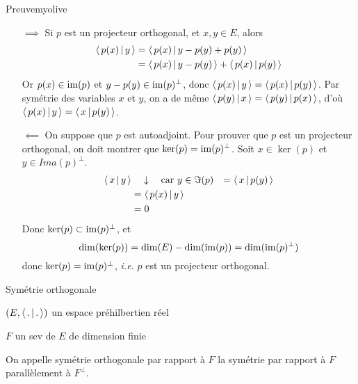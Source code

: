         \begin{demo}{Preuve}{myolive}
            \begin{itemize}
                \item[$\implies$] Si $p$ est un projecteur orthogonal, et $x,y \in E$, alors 
                \begin{align*}
                    \left<\,p(x)\,\middle|\,y\,\right> 
                    &= \left<\,p(x)\,\middle|\,y - p(y) + p(y)\,\right> \\
                    &= \left<\,p(x)\,\middle|\,y - p(y)\,\right> + \left<\,p(x)\,\middle|\,p(y)\,\right> \\
                \end{align*}
                Or $p(x) \in \operatorname{im}(p)$ et $y - p(y) \in \operatorname{im}(p)^{\perp}$, donc $\left<\,p(x)\,\middle|\,y\,\right> = \left<\,p(x)\,\middle|\,p(y)\,\right>$. Par symétrie des variables $x$ et $y$, on a de même $\left<\,p(y)\,\middle|\,x\,\right> = \left<\,p(y)\,\middle|\,p(x)\,\right>$, d’où $\left<\,p(x)\,\middle|\,y\,\right> = \left<\,x\,\middle|\,p(y)\,\right>$.
                \item[$\impliedby$] On suppose que $p$ est autoadjoint. Pour prouver que $p$ est un projecteur orthogonal, on doit montrer que $\ker(p) = \operatorname{im}(p)^{\perp}$. Soit $x \in \ker(p)$ et $y \in Ima(p)^{\perp}$. 
                \begin{align*}
                    \left<\,x\,\middle|\,y\,\right> 
                    & \quad \downarrow \quad \text{car } y \in \Im(p)
                    &= \left<\,x\,\middle|\,p(y)\,\right> \\
                    &= \left<\,p(x)\,\middle|\,y\,\right> \\
                    &= 0
                \end{align*}
                Donc $\ker(p) \subset \operatorname{im}(p)^{\perp}$, et 
                \[ \dim(\ker(p)) = \dim(E) - \dim(\operatorname{im}(p)) = \dim(\operatorname{im}(p)^{\perp}) \]   donc $\ker(p) = \operatorname{im}(p)^{\perp}$, \textit{i.e.} $p$ est un projecteur orthogonal.
            \end{itemize}
        \end{demo}

        \begin{defi}{Symétrie orthogonale}{}
            \begin{soient}
                \item $(E,\left<\,.\,\middle|\,.\,\right>)$ un espace préhilbertien réel
                \item $F$ un sev de $E$ de dimension finie
            \end{soient}
            On appelle symétrie orthogonale par rapport à $F$ la symétrie par rapport à $F$ parallèlement à $F^{\perp}$.
        \end{defi}

